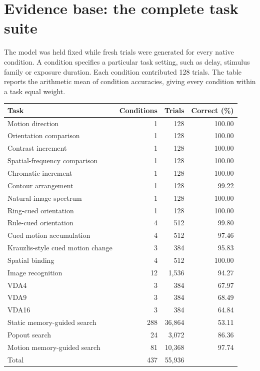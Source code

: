 \documentclass[11pt,letterpaper]{article}
\begin{document}
\clearpage
\section*{Evidence base: the complete task suite}
The model was held fixed while fresh trials were generated for every native condition. A condition specifies a particular task setting, such as delay, stimulus family or exposure duration. Each condition contributed 128 trials. The table reports the arithmetic mean of condition accuracies, giving every condition within a task equal weight.

\begin{center}\small
\begin{tabularx}{\linewidth}{@{}Xrrr@{}}
\toprule Task & Conditions & Trials & Correct (\%)\\\midrule
Motion direction & 1 & 128 & 100.00\\
Orientation comparison & 1 & 128 & 100.00\\
Contrast increment & 1 & 128 & 100.00\\
Spatial-frequency comparison & 1 & 128 & 100.00\\
Chromatic increment & 1 & 128 & 100.00\\
Contour arrangement & 1 & 128 & 99.22\\
Natural-image spectrum & 1 & 128 & 100.00\\
Ring-cued orientation & 1 & 128 & 100.00\\
Rule-cued orientation & 4 & 512 & 99.80\\
Cued motion accumulation & 4 & 512 & 97.46\\
Krauzlis-style cued motion change & 3 & 384 & 95.83\\
Spatial binding & 4 & 512 & 100.00\\
Image recognition & 12 & 1,536 & 94.27\\
VDA4 & 3 & 384 & 67.97\\
VDA9 & 3 & 384 & 68.49\\
VDA16 & 3 & 384 & 64.84\\
Static memory-guided search & 288 & 36,864 & 53.11\\
Popout search & 24 & 3,072 & 86.36\\
Motion memory-guided search & 81 & 10,368 & 97.74\\\midrule
Total & 437 & 55,936 & \\\bottomrule
\end{tabularx}
\end{center}
\end{document}
